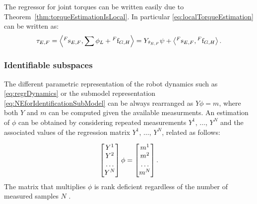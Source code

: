 The regressor for joint torques can be written easily due to Theorem~\ref{thm:torqueEstimationIsLocal}. In particular \eqref{eq:localTorqueEstimation} can be written as:
\begin{equation}
\label{eq:localTorqueEstimationForIdentification}
\tau_{E,F} = \left< \hspace{0em}^F \mathrm{s}_{E,F} , \sum \phi_L + \hspace{0em}^F {\rm f}_{G,H} \right> = Y_{\hat{\tau}_{E,F}} \psi + \left< \hspace{0em}^F \mathrm{s}_{E,F} ,  \hspace{0em}^F {\rm f}_{G,H} \right> .
\end{equation}
 

\subsubsection{Identifiable subspaces}
\label{sec:baseParam}

The different parametric representation of the robot dynamics such as \eqref{eq:regrDynamics} or the submodel representation \eqref{eq:NEforIdentificationSubModel} can be always rearranged as $Y \phi = m$, where both $Y$ and $m$ can be computed given the available measurments. An 
 estimation of $\phi$ can be obtained by considering repeated measurements $Y
 ^1$, $\dots$, $Y^N$ and the associated values of the regression matrix $Y^1$, $
 \dots$, $Y^N$, related as follows:
 
\begin{equation}
\label{eq:bigRegression}
\begin{bmatrix} 
{Y}^1 
\\
{Y}^2
\\
\dots
\\
{Y}^N
\\
\end{bmatrix}
\phi
=
\begin{bmatrix}
m^1
\\
m^2
\\
\dots
\\
m^N
\end{bmatrix}.
\end{equation}
The matrix that multiplies $\phi$ is rank deficient regardless of the number of measured samples $N$ \citep{handbookident}. 

